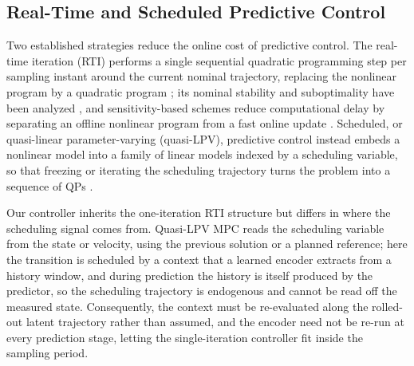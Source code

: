 \subsection{Real-Time and Scheduled Predictive Control}

Two established strategies reduce the online cost of predictive control. The real-time iteration (RTI) performs a single sequential quadratic programming step per sampling instant around the current nominal trajectory, replacing the nonlinear program by a quadratic program \cite{diehl2005realtime, gros2020rti}; its nominal stability and suboptimality have been analyzed \cite{diehl2005rtistability}, and sensitivity-based schemes reduce computational delay by separating an offline nonlinear program from a fast online update \cite{zavala2009advancedstep}. Scheduled, or quasi-linear parameter-varying (quasi-LPV), predictive control instead embeds a nonlinear model into a family of linear models indexed by a scheduling variable, so that freezing or iterating the scheduling trajectory turns the problem into a sequence of QPs \cite{rugh2000gain, leith1998velocity, cisneros2016qlmpc, cisneros2020qlpv}.

Our controller inherits the one-iteration RTI structure but differs in where the scheduling signal comes from. Quasi-LPV MPC reads the scheduling variable from the state or velocity, using the previous solution or a planned reference; here the transition is scheduled by a context that a learned encoder extracts from a history window, and during prediction the history is itself produced by the predictor, so the scheduling trajectory is endogenous and cannot be read off the measured state. Consequently, the context must be re-evaluated along the rolled-out latent trajectory rather than assumed, and the encoder need not be re-run at every prediction stage, letting the single-iteration controller fit inside the sampling period.
